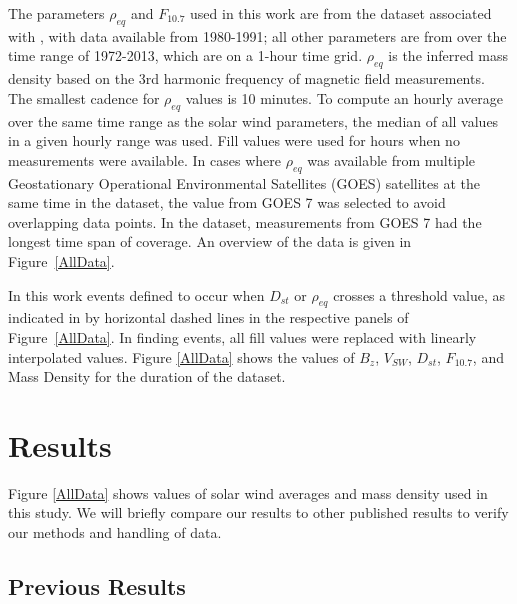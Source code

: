 \documentclass[10pt,twocolumn]{article}
\begin{document}
The parameters $\rho_{eq}$ and $F_{10.7}$ used in this work are from the dataset associated with \cite{Denton}, with data available from 1980-1991; all other parameters are from \cite{Reconstruction} over the time range of 1972-2013, which are on a 1-hour time grid. $\rho_{eq}$ is the inferred mass density based on the 3rd harmonic frequency of magnetic field measurements.  The smallest cadence for $\rho_{eq}$ values is 10 minutes.  To compute an hourly average over the same time range as the solar wind parameters, the median of all values in a given hourly range was used.  Fill values were used for hours when no measurements were available.  In cases where $\rho_{eq}$ was available from multiple Geostationary Operational Environmental Satellites (GOES) satellites at the same time in the \cite{Denton} dataset, the value from GOES 7 was selected to avoid overlapping data points.  In the dataset, measurements from GOES 7 had the longest time span of coverage.  An overview of the data is given in Figure~\ref{AllData}.


In this work events defined to occur when $D_{st}$ or $\rho_{eq}$ crosses a threshold value, as indicated in by horizontal dashed lines in the respective panels of Figure~\ref{AllData}.  In finding events, all fill values were replaced with linearly interpolated values.  Figure \ref{AllData} shows the values of $B_z$, $V_{SW}$, $D_{st}$, $F_{10.7}$, and Mass Density for the duration of the dataset. 


\section{Results}
Figure \ref{AllData} shows values of solar wind averages and mass density used in this study. We will briefly compare our results to other published results to verify our methods and handling of data. 

\subsection{Previous Results}
\end{document}
